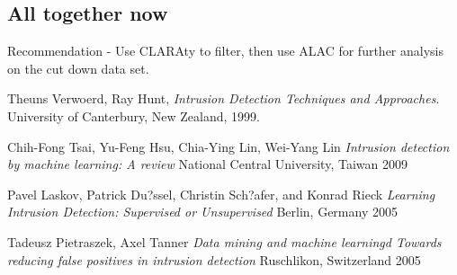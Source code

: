 \documentclass{article}
\begin{document}
\subsection*{All together now}
Recommendation - Use CLARAty to filter, then use ALAC for further analysis on the cut down data set.\\


\begin{thebibliography}{1}

  Theuns Verwoerd, Ray Hunt,
  \emph{Intrusion Detection Techniques and Approaches}.
  University of Canterbury, New Zealand,
  1999.

  Chih-Fong Tsai, Yu-Feng Hsu, Chia-Ying Lin, Wei-Yang Lin
  \emph{Intrusion detection by machine learning: A review}
  National Central University, Taiwan
  2009
  
  Pavel Laskov, Patrick Du?ssel, Christin Sch?afer, and Konrad Rieck
  \emph{Learning Intrusion Detection: Supervised or Unsupervised}
  Berlin, Germany
  2005
  
  Tadeusz Pietraszek, Axel Tanner
  \emph{Data mining and machine learningd Towards reducing false positives in intrusion detection}
  Ruschlikon, Switzerland
  2005
\end{thebibliography}
\end{document}
